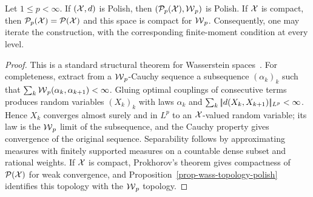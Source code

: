 \begin{prop}\label{prop-wasserstein-space-polish}
	Let $1\leq p<\infty$. If $(\mathcal{X},d)$ is Polish, then $(\mathcal{P}_p(\mathcal{X}),\operatorname{\mathcal{W}}_p)$ is Polish. If $\mathcal{X}$ is compact, then $\mathcal{P}_p(\mathcal{X})=\mathcal{P}(\mathcal{X})$ and this space is compact for $\operatorname{\mathcal{W}}_p$. Consequently, one may iterate the construction, with the corresponding finite-moment condition at every level.
\end{prop}
\begin{proof}
	This is a standard structural theorem for Wasserstein spaces~\cite{Villani09,SantambrogioBook,ambrosio2006gradient}. For completeness, extract from a $\operatorname{\mathcal{W}}_p$-Cauchy sequence a subsequence $(\alpha_k)_k$ such that $\sum_k\operatorname{\mathcal{W}}_p(\alpha_k,\alpha_{k+1})<\infty$. Gluing optimal couplings of consecutive terms produces random variables $(X_k)_k$ with laws $\alpha_k$ and $\sum_k|\!| d(X_k,X_{k+1}) |\!|_{L^p}<\infty$. Hence $X_k$ converges almost surely and in $L^p$ to an $\mathcal{X}$-valued random variable; its law is the $\operatorname{\mathcal{W}}_p$ limit of the subsequence, and the Cauchy property gives convergence of the original sequence. Separability follows by approximating measures with finitely supported measures on a countable dense subset and rational weights. If $\mathcal{X}$ is compact, Prokhorov's theorem gives compactness of $\mathcal{P}(\mathcal{X})$ for weak convergence, and Proposition~\ref{prop-wass-topology-polish} identifies this topology with the $\operatorname{\mathcal{W}}_p$ topology.
\end{proof}

